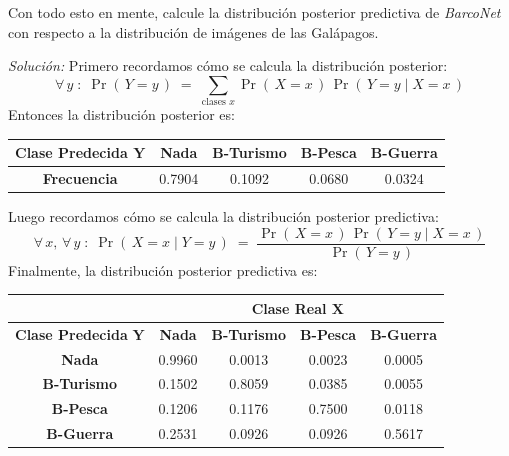 \documentclass[ a4paper, twoside, 11pt]{article}
\begin{document}
\begin{problem}
Con todo esto en mente, calcule la distribuci\'on posterior predictiva de \emph{BarcoNet} con respecto a la distribuci\'on de im\'agenes de las Gal\'apagos. 

\emph{Soluci\'on:} Primero recordamos c\'omo se calcula la distribuci\'on posterior: 
\[
\forall \, y \; \colon \;
\Pr( \, Y = y \, ) \; = \;
\sum_{\text{clases }x}
\Pr( \, X = x \, ) \, \Pr( \, Y = y \mid X = x \, )
\]
Entonces la distribuci\'on posterior es: 
\begin{table}[H]
\centering
\begin{tabular}{|c|c|c|c|c|}
\hline
\textbf{Clase Predecida $\boldsymbol{Y}$} & \textbf{Nada} & \textbf{B-Turismo} & \textbf{B-Pesca} & \textbf{B-Guerra} \\ \hline
\textbf{Frecuencia} & 0.7904 & 0.1092 & 0.0680 & 0.0324 \\ \hline
\end{tabular}
\end{table}
Luego recordamos c\'omo se calcula la distribuci\'on posterior predictiva: 
\[
\forall \, x, \, \forall \, y \; \colon \;
\Pr( \, X = x \mid Y = y \, ) \; = \;
\frac{ \Pr( \, X = x \, ) \, \Pr( \, Y=y \mid X=x \, )}{ \Pr( \, Y = y \, )}
\]
Finalmente, la distribuci\'on posterior predictiva es: 
\begin{table}[H]
\centering
\begin{tabular}{c|c|c|c|c|}
\cline{2-5}
 & \multicolumn{4}{c|}{\textbf{Clase Real} $\boldsymbol{X}$} \\ \hline
\multicolumn{1}{|c|}{\textbf{Clase Predecida} $\boldsymbol{Y}$} & \textbf{Nada} & \textbf{B-Turismo} & \textbf{B-Pesca} & \textbf{B-Guerra} \\ \hline
\multicolumn{1}{|c|}{\textbf{Nada}} & 0.9960 & 0.0013 & 0.0023 & 0.0005 \\ \hline
\multicolumn{1}{|c|}{\textbf{B-Turismo}} & 0.1502 & 0.8059 & 0.0385 & 0.0055 \\ \hline
\multicolumn{1}{|c|}{\textbf{B-Pesca}} & 0.1206 & 0.1176 & 0.7500 & 0.0118 \\ \hline
\multicolumn{1}{|c|}{\textbf{B-Guerra}} & 0.2531 & 0.0926 & 0.0926 & 0.5617 \\ \hline
\end{tabular}
\end{table}
\QED

\end{problem}
\fullskip
\end{document}
